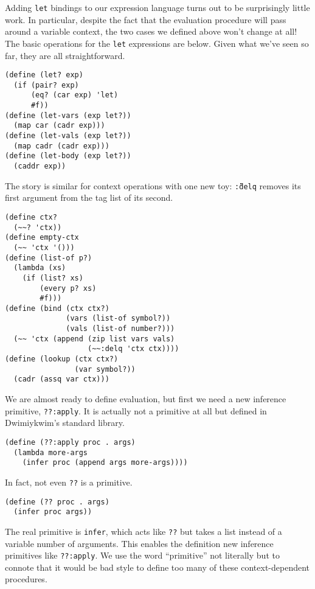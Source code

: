 \documentclass[11pt]{article}
\begin{document}
Adding \texttt{let} bindings to our expression language
turns out to be surprisingly little work.
In particular,
despite the fact that the evaluation procedure
will pass around a variable context,
the two cases we defined above won't change at all!
The basic operations for the \texttt{let} expressions are below.
Given what we've seen so far, they are all straightforward.
\begin{Verbatim}
(define (let? exp)
  (if (pair? exp)
      (eq? (car exp) 'let)
      #f))
(define (let-vars (exp let?))
  (map car (cadr exp)))
(define (let-vals (exp let?))
  (map cadr (cadr exp)))
(define (let-body (exp let?))
  (caddr exp))
\end{Verbatim}
The story is similar for context operations with one new toy:
\texttt{\~\~:delq} removes its first argument from the tag list of its second.
\begin{Verbatim}
(define ctx?
  (~~? 'ctx))
(define empty-ctx
  (~~ 'ctx '()))
(define (list-of p?)
  (lambda (xs)
    (if (list? xs)
        (every p? xs)
        #f)))
(define (bind (ctx ctx?)
              (vars (list-of symbol?))
              (vals (list-of number?)))
  (~~ 'ctx (append (zip list vars vals)
                   (~~:delq 'ctx ctx))))
(define (lookup (ctx ctx?)
                (var symbol?))
  (cadr (assq var ctx)))
\end{Verbatim}

We are almost ready to define evaluation,
but first we need a new inference primitive, \texttt{??:apply}.
It is actually not a primitive at all
but defined in Dwimiykwim's standard library.
\begin{Verbatim}
(define (??:apply proc . args)
  (lambda more-args
    (infer proc (append args more-args))))
\end{Verbatim}
In fact, not even \texttt{??} is a primitive.
\begin{Verbatim}
(define (?? proc . args)
  (infer proc args))
\end{Verbatim}
The real primitive is \texttt{infer},
which acts like \texttt{??}
but takes a list instead of a variable number of arguments.
This enables the definition new inference primitives like \texttt{??:apply}.
We use the word ``primitive'' not literally
but to connote that it would be bad style to define too many of these
context-dependent procedures.
\end{document}
